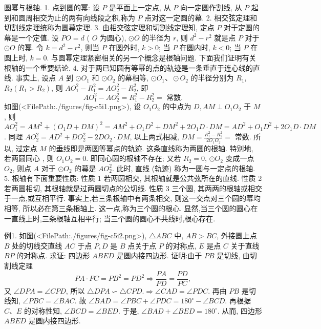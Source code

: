 
圆幂与根轴.
1. 点到圆的幂: 设 $P$ 是平面上一定点, 从 $P$ 向一定圆作割线, 从 $P$ 起到和圆周相交为止的两有向线段之积,称为 $P$ 点对这一定圆的幕.
2. 相交弦定理和切割线定理统称为圆幕定理.
3. 由相交弦定理和切割线定理知, 定点 $P$ 对于定圆的幕是一个定值.
设 $P O=d$ ( $O$ 为圆心), $\odot O$ 的半径为 $r$, 则 $d^2-r^2$ 就是点 $P$ 对于 $\odot O$ 的幂.
令 $k= d^2-r^2$, 则当 $P$ 在圆外时, $k>0$; 当 $P$ 在圆内时, $k<0$; 当 $P$ 在圆上时, $k=0$.
与圆幂定理紧密相关的另一个概念是根轴问题.
下面我们证明有关根轴的一个重要结论.
4. 对于两已知圆有等幂的点的轨迹是一条垂直于连心线的直线.
事实上, 设点 $A$ 到 $\odot O_1$ 和 $\odot O_2$ 的幕相等, $\odot O_1 、 \odot O_2$ 的半径分别为 $R_1$, $R_2\left(R_1>R_2\right)$, 则 $A O_1^2-R_1^2=A O_2^2-R_2^2$, 即
$$
A O_1^2-A O_2^2=R_1^2-R_2^2=\text { 常数.
}
$$
如图(<FilePath:./figures/fig-c5i1.png>), 设 $O_1 O_2$ 的中点为 $D, A M \perp O_1 O_2$ 于 $M$, 则 $A O_1^2=A M^2+\left(O_1 D+D M\right)^2= A M^2+O_1 D^2+D M^2+2 O_1 D \cdot D M=A D^2+ O_1 D^2+2 O_1 D \cdot D M$.
同理 $A O_2^2=A D^2+D O_2^2-2 D O_2 \cdot D M$, 以上两式相减, $D M=\frac{R_1^2-R_2^2}{2 O_1 O_2}=$ 常数.
所以, 过定点 $M$ 的垂线即是两圆等幂点的轨迹.
这条直线称为两圆的根轴.
特别地, 若两圆同心 , 则 $O_1 O_2=0$. 即同心圆的根轴不存在; 又若 $R_2=0$, $\odot O_2$ 变成一点 $O_2$, 则点 $A$ 对于 $\odot O_2$ 的幕是 $A O_2^2$. 此时, 直线 (轨迹) 称为一圆与一定点的根轴.
5. 根轴有下面重要性质:
性质 1 若两圆相交, 其根轴就是公共弦所在的直线.
性质 2 若两圆相切, 其根轴就是过两圆切点的公切线.
性质 3 三个圆, 其两两的根轴或相交于一点,或互相平行.
事实上,若三条根轴中有两条相交, 则这一交点对三个圆的幕均相等, 所以必在第三条根轴上.
这一点,称为三个圆的根心.
显然,当三个圆的圆心在一直线上时,三条根轴互相平行; 当三个圆的圆心不共线时,根心存在.



例1. 如图(<FilePath:./figures/fig-c5i2.png>), $\triangle A B C$ 中, $A B>B C$, 外接圆上点 $B$ 处的切线交直线 $A C$ 于点 $P, D$ 是 $B$ 点关于点 $P$ 的对称点, $E$ 是点 $C$ 关于直线 $B P$ 的对称点.
求证: 四边形 $A B E D$ 是圆内接四边形.
证明:由于 $P B$ 是切线, 由切割线定理
$$
P A \cdot P C=P B^2=P D^2 \Rightarrow \frac{P A}{P D}=\frac{P D}{P C},
$$
又 $\angle D P A=\angle C P D$, 所以 $\triangle D P A \backsim \triangle C P D . \Rightarrow \angle C A D=\angle P D C$.
再由 $P B$ 是切线知, $\angle P B C=\angle B A C$.
故 $\angle B A D=\angle P B C+\angle P D C=180^{\circ}-\angle B C D$.
再根据 $C 、 E$ 的对称性知, $\angle B C D=\angle B E D$.
于是, $\angle B A D+\angle B E D=180^{\circ}$.
从而, 四边形 $A B E D$ 是圆内接四边形.



